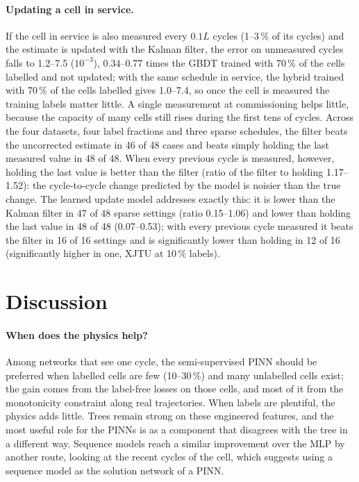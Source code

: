 \documentclass[11pt,a4paper]{article}
\begin{document}


\paragraph{Updating a cell in service.} If the cell in service is also measured every $0.1L$ cycles (1--3\,\% of its
cycles) and the estimate is updated with the Kalman filter, the error on unmeasured cycles falls to 1.2--7.5 ($10^{-3}$),
0.34--0.77 times the GBDT trained with 70\,\% of the cells labelled and not updated; with the same schedule in
service, the hybrid trained with 70\,\% of the cells labelled gives 1.0--7.4, so once the cell is measured the training
labels matter little. A single measurement at commissioning helps little, because the capacity of many cells still rises
during the first tens of cycles. Across the four datasets, four label fractions and three sparse schedules,
the filter beats the uncorrected estimate in 46 of 48 cases and beats simply holding the last measured value in 48 of
48. When every previous cycle is measured, however, holding the last value is better than the filter (ratio of the
filter to holding 1.17--1.52): the cycle-to-cycle change predicted by the model is noisier than the true change. The
learned update model addresses exactly this: it is lower than the Kalman filter in 47 of 48 sparse settings (ratio
0.15--1.06) and lower than holding the last value in 48 of 48 (0.07--0.53); with every previous cycle measured it beats
the filter in 16 of 16 settings and is significantly lower than holding in 12 of 16 (significantly higher in one,
XJTU at 10\,\% labels).

\section{Discussion}\label{sec:discussion}

\paragraph{When does the physics help?} Among networks that see one cycle, the semi-supervised PINN should be preferred
when labelled cells are few (10--30\,\%) and many unlabelled cells exist; the gain comes from the label-free losses on
those cells, and most of it from the monotonicity constraint along real trajectories. When labels are plentiful, the
physics adds little. Trees remain strong on these engineered features, and the most useful role for the PINNs is as a
component that disagrees with the tree in a different way. Sequence models reach a similar improvement over the MLP by
another route, looking at the recent cycles of the cell, which suggests using a sequence model as the solution network
of a PINN.
\end{document}
